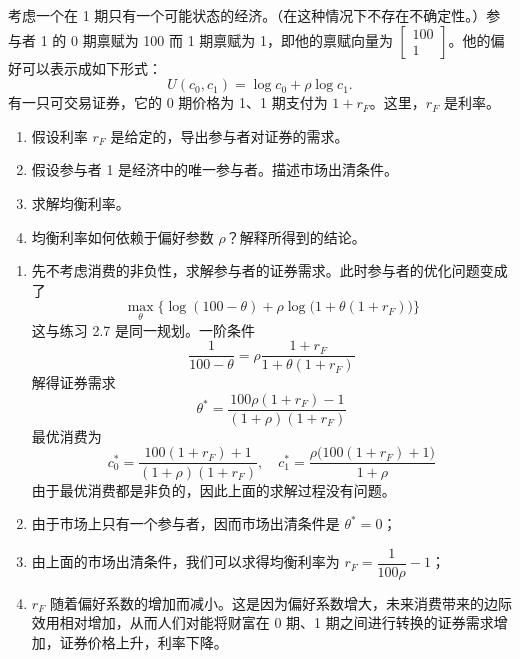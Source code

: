 \begin{problem}
 考虑一个在 1 期只有一个可能状态的经济。（在这种情况下不存在不确定性。）参与者 1 的 0 期禀赋为 100 而 1 期禀赋为 1，即他的禀赋向量为 $\begin{bmatrix}100 \\ 1\end{bmatrix}$。他的偏好可以表示成如下形式：
\[
    U(c_{0},c_{1})=\log c_{0}+\rho\log c_{1}.
\]
有一只可交易证券，它的 0 期价格为 1、1 期支付为 $1+r_{F}$。这里，$r_{F}$ 是利率。
\begin{enumerate}[label=(\alph*)]
    \item 假设利率 $r_{F}$ 是给定的，导出参与者对证券的需求。
    \item 假设参与者 1 是经济中的唯一参与者。描述市场出清条件。
    \item 求解均衡利率。
    \item 均衡利率如何依赖于偏好参数 $\rho$？解释所得到的结论。
\end{enumerate}
\end{problem}
\begin{solution}
\begin{enumerate}[label=(\alph*)]
    \item 先不考虑消费的非负性，求解参与者的证券需求。此时参与者的优化问题变成了
    \[
        \max_{\theta}\bigl\{\log(100-\theta)+\rho\log\bigl(1+\theta(1+r_{F})\bigr)\bigr\}
    \]
    这与练习 2.7 是同一规划。一阶条件
    \[
        \frac{1}{100-\theta}=\rho\frac{1+r_{F}}{1+\theta(1+r_{F})}
    \]
    解得证券需求
    \[
        \theta^{*}=\frac{100\rho(1+r_{F})-1}{(1+\rho)(1+r_{F})}
    \]
    最优消费为
    \[
        c_{0}^{*}=\frac{100(1+r_{F})+1}{(1+\rho)(1+r_{F})},\quad
        c_{1}^{*}=\frac{\rho\bigl(100(1+r_{F})+1\bigr)}{1+\rho}
    \]
    由于最优消费都是非负的，因此上面的求解过程没有问题。
    \item 由于市场上只有一个参与者，因而市场出清条件是 $\theta^{*}=0$；
    \item 由上面的市场出清条件，我们可以求得均衡利率为 $r_{F}=\dfrac{1}{100\rho}-1$；
    \item $r_{F}$ 随着偏好系数的增加而减小。这是因为偏好系数增大，未来消费带来的边际效用相对增加，从而人们对能将财富在 0 期、1 期之间进行转换的证券需求增加，证券价格上升，利率下降。
\end{enumerate}
\end{solution}

